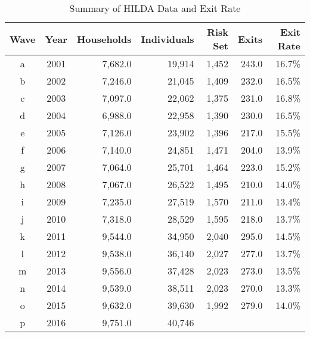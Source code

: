 \begin{table}[htpb]
\centering
\caption{Summary of HILDA Data and Exit Rate} 
\label{HILDAsum}
\begin{tabular}{ccrrrrr}
  \toprule
Wave & Year & Households & Individuals & Risk Set & Exits & Exit Rate \\ 
  \midrule
a & 2001 & 7,682.0 & 19,914 & 1,452 & 243.0 & 16.7\% \\ 
  b & 2002 & 7,246.0 & 21,045 & 1,409 & 232.0 & 16.5\% \\ 
  c & 2003 & 7,097.0 & 22,062 & 1,375 & 231.0 & 16.8\% \\ 
  d & 2004 & 6,988.0 & 22,958 & 1,390 & 230.0 & 16.5\% \\ 
  e & 2005 & 7,126.0 & 23,902 & 1,396 & 217.0 & 15.5\% \\ 
  f & 2006 & 7,140.0 & 24,851 & 1,471 & 204.0 & 13.9\% \\ 
  g & 2007 & 7,064.0 & 25,701 & 1,464 & 223.0 & 15.2\% \\ 
  h & 2008 & 7,067.0 & 26,522 & 1,495 & 210.0 & 14.0\% \\ 
  i & 2009 & 7,235.0 & 27,519 & 1,570 & 211.0 & 13.4\% \\ 
  j & 2010 & 7,318.0 & 28,529 & 1,595 & 218.0 & 13.7\% \\ 
  k & 2011 & 9,544.0 & 34,950 & 2,040 & 295.0 & 14.5\% \\ 
  l & 2012 & 9,538.0 & 36,140 & 2,027 & 277.0 & 13.7\% \\ 
  m & 2013 & 9,556.0 & 37,428 & 2,023 & 273.0 & 13.5\% \\ 
  n & 2014 & 9,539.0 & 38,511 & 2,023 & 270.0 & 13.3\% \\ 
  o & 2015 & 9,632.0 & 39,630 & 1,992 & 279.0 & 14.0\% \\ 
  p & 2016 & 9,751.0 & 40,746 &  &  &  \\ 
   \bottomrule
\end{tabular}
\end{table}
